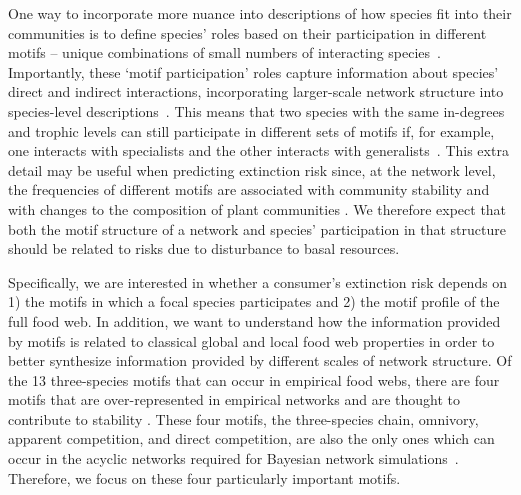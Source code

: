 \documentclass[12pt]{article}
\begin{document}
\begin{spacing}{2.0}
    One way to incorporate more nuance into descriptions of how species fit into their communities is to define species' roles based on their participation in different motifs -- unique combinations of small numbers of interacting species~\citep{Stouffer2007,Stouffer2012}. Importantly, these `motif participation' roles capture information about species' direct and indirect interactions, incorporating larger-scale network structure into species-level descriptions~\citep{Cirtwill2015a}. 
    This means that two species with the same in-degrees and trophic levels can still participate in different sets of motifs if, for example, one interacts with specialists and the other interacts with generalists~\citep{Cirtwill2018FoodWebs}. 
    This extra detail may be useful when predicting  extinction risk since, at the network level, the frequencies of different motifs are associated with community stability \citep{prill2005dynamic, bascompte2005simple} and with changes to the composition of plant communities \citep{giling2019plant}. 
    We therefore expect that both the motif structure of a network and species' participation in that structure should be related to risks due to disturbance to basal resources. 
    
    Specifically, we are interested in whether a consumer's extinction risk depends on 1) the motifs in which a focal species participates and 2) the motif profile of the full food web. 
    In addition, we want to understand how the information provided by motifs is related to classical global and local food web properties in order to better synthesize information provided by different scales of network structure.
    Of the 13 three-species motifs that can occur in empirical food webs, there are four motifs that are over-represented in empirical networks and are thought to contribute to stability \citep{Stouffer2007, Borrelli2015a, giling2019plant}. These four motifs, the three-species chain, omnivory, apparent competition, and direct competition, are also the only ones which can occur in the acyclic networks required for Bayesian network simulations~\citep{Eklof2013}. 
    Therefore, we focus on these four particularly important motifs.  
    


\end{spacing}
\end{document}
